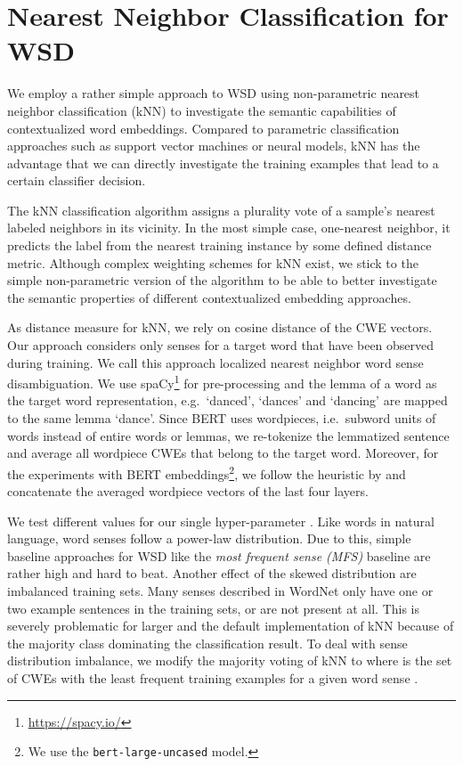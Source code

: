 \documentclass[11pt]{article}
\begin{document}
\section{Nearest Neighbor Classification for WSD}
We employ a rather simple approach to WSD using non-parametric nearest neighbor classification (kNN) to investigate the semantic capabilities of contextualized word embeddings.
Compared to parametric classification approaches such as support vector machines or neural models, kNN has the advantage that we can directly investigate the training examples that lead to a certain classifier decision.

The kNN classification algorithm \cite{cover.1967} assigns a plurality vote of a sample's nearest labeled neighbors in its vicinity.
In the most simple case, one-nearest neighbor, it predicts the label from the nearest training instance by some defined distance metric.
Although complex weighting schemes for kNN exist, we stick to the simple non-parametric version of the algorithm to be able to better investigate the semantic properties of different contextualized embedding approaches.


As distance measure for kNN, we rely on cosine distance of the CWE vectors.
Our approach considers only senses for a target word that have been observed during training.
We call this approach localized nearest neighbor word sense disambiguation.
We use spaCy\footnote{\small\url{https://spacy.io/}} \cite{spacy:2015:EMNLP} for pre-processing and the lemma of a word as the target word representation, e.g.\ `danced', `dances' and `dancing' are mapped to the same lemma `dance'.
Since BERT uses wordpieces, i.e.\ subword units of words instead of entire words or lemmas, we re-tokenize the lemmatized sentence and average all wordpiece CWEs that belong to the target word.
Moreover, for the experiments with BERT embeddings\footnote{We use the \texttt{bert-large-uncased} model.}, we follow the heuristic by  and concatenate the averaged wordpiece vectors of the last four layers.


We test different values for our single hyper-parameter . 
Like words in natural language, word senses follow a power-law distribution.
Due to this, simple baseline approaches for WSD like the \textit{most frequent sense (MFS)} baseline are rather high and hard to beat.
Another effect of the skewed distribution are imbalanced training sets.
Many senses described in WordNet only have one or two example sentences in the training sets, or are not present at all.
This is severely problematic for larger  and the default implementation of kNN because of the majority class dominating the classification result.
To deal with sense distribution imbalance, we modify the majority voting of kNN to  where  is the set of CWEs with the least frequent training examples for a given word sense .
\end{document}
